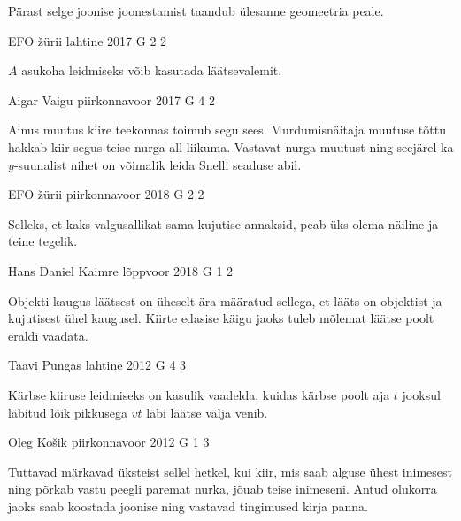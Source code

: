 \documentclass[11pt]{article}
\begin{document}
{{\ifHint
Pärast selge joonise joonestamist taandub ülesanne geomeetria peale.
\fi
}

{EFO žürii} %
{lahtine} %
{2017} %
{G 2} %
{2} %
{

\ifHint
$A$ asukoha leidmiseks võib kasutada läätsevalemit.
\fi
}

{Aigar Vaigu} %
{piirkonnavoor} %
{2017} %
{G 4} %
{2} %
{

\ifHint
Ainus muutus kiire teekonnas toimub segu sees. Murdumisnäitaja muutuse tõttu hakkab kiir segus teise nurga all liikuma. Vastavat nurga muutust ning seejärel ka $y$-suunalist nihet on võimalik leida Snelli seaduse abil.
\fi
}

{EFO žürii} %
{piirkonnavoor} %
{2018} %
{G 2} %
{2} %
{

\ifHint
Selleks, et kaks valgusallikat sama kujutise annaksid, peab üks olema näiline ja teine tegelik.
\fi
}

{Hans Daniel Kaimre} %
{lõppvoor} %
{2018} %
{G 1} %
{2} %
{

\ifHint
Objekti kaugus läätsest on üheselt ära määratud sellega, et lääts on objektist ja kujutisest ühel kaugusel. Kiirte edasise käigu jaoks tuleb mõlemat läätse poolt eraldi vaadata.
\fi
}

{Taavi Pungas} %
{lahtine} %
{2012} %
{G 4} %
{3} %
{

\ifHint
Kärbse kiiruse leidmiseks on kasulik vaadelda, kuidas kärbse poolt aja $t$ jooksul läbitud lõik pikkusega $vt$ läbi läätse välja venib.
\fi
}

{Oleg Košik} %
{piirkonnavoor} %
{2012} %
{G 1} %
{3} %
{

\ifHint
Tuttavad märkavad üksteist sellel hetkel, kui kiir, mis saab alguse ühest inimesest ning põrkab vastu peegli paremat nurka, jõuab teise inimeseni. Antud olukorra jaoks saab koostada joonise ning vastavad tingimused kirja panna.
\fi
}

}
\end{document}
